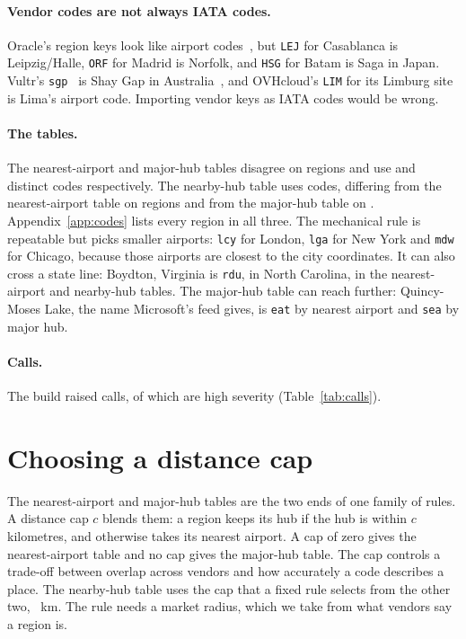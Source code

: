 \documentclass[10pt,twocolumn]{article}
\newcommand{\code}[1]{\texttt{#1}}
\begin{document}
\paragraph{Vendor codes are not always IATA codes.} Oracle's region keys look like airport codes~\citep{oracle_regions}, but \code{LEJ} for Casablanca is Leipzig/Halle, \code{ORF} for Madrid is Norfolk, and \code{HSG} for Batam is Saga in Japan. Vultr's \code{sgp}~\citep{vultr_regions_api} is Shay Gap in Australia~\citep{ourairports_data}, and OVHcloud's \code{LIM} for its Limburg site is Lima's airport code. Importing vendor keys as IATA codes would be wrong.

\paragraph{The tables.} The nearest-airport and major-hub tables disagree on \tableDiffCount{} regions and use \tableADistinct{} and \tableBDistinct{} distinct codes respectively. The nearby-hub table uses \tableCDistinct{} codes, differing from the nearest-airport table on \tableDiffAC{} regions and from the major-hub table on \tableDiffBC{}. Appendix~\ref{app:codes} lists every region in all three. The mechanical rule is repeatable but picks smaller airports: \code{lcy} for London, \code{lga} for New York and \code{mdw} for Chicago, because those airports are closest to the city coordinates. It can also cross a state line: Boydton, Virginia is \code{rdu}, in North Carolina, in the nearest-airport and nearby-hub tables. The major-hub table can reach further: Quincy-Moses Lake, the name Microsoft's feed gives, is \code{eat} by nearest airport and \code{sea} by major hub.

\paragraph{Calls.} The build raised \callCount{} calls, of which \highCallCount{} are high severity (Table~\ref{tab:calls}).

\begin{table}[t]
\centering
\small

\caption{Gaps and judgement calls raised by the build.}
\label{tab:calls}
\end{table}

\section{Choosing a distance cap}
\label{sec:cap}

The nearest-airport and major-hub tables are the two ends of one family of rules. A distance cap $c$ blends them: a region keeps its hub if the hub is within $c$ kilometres, and otherwise takes its nearest airport. A cap of zero gives the nearest-airport table and no cap gives the major-hub table. The cap controls a trade-off between overlap across vendors and how accurately a code describes a place. The nearby-hub table uses the cap that a fixed rule selects from the other two, \capUsed{}~km. The rule needs a market radius, which we take from what vendors say a region is.
\end{document}

